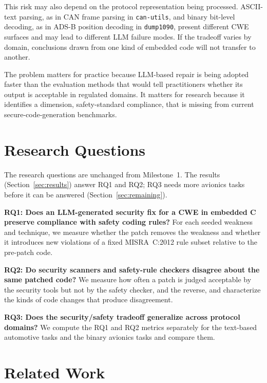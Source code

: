 \documentclass[12pt]{IEEEtran}
\begin{document}
This risk may also depend on the protocol representation being processed. ASCII-text parsing, as in CAN frame parsing in \texttt{can-utils}, and binary bit-level decoding, as in ADS-B position decoding in \texttt{dump1090}, present different CWE surfaces and may lead to different LLM failure modes. If the tradeoff varies by domain, conclusions drawn from one kind of embedded code will not transfer to another.

The problem matters for practice because LLM-based repair is being adopted faster than the evaluation methods that would tell practitioners whether its output is acceptable in regulated domains. It matters for research because it identifies a dimension, safety-standard compliance, that is missing from current secure-code-generation benchmarks.

\section{Research Questions}
The research questions are unchanged from Milestone~1. The results (Section~\ref{sec:results}) answer RQ1 and RQ2; RQ3 needs more avionics tasks before it can be answered (Section~\ref{sec:remaining}).

\textbf{RQ1: Does an LLM-generated security fix for a CWE in embedded C preserve compliance with safety coding rules?}
For each seeded weakness and technique, we measure whether the patch removes the weakness and whether it introduces new violations of a fixed MISRA~C:2012 rule subset relative to the pre-patch code.

\textbf{RQ2: Do security scanners and safety-rule checkers disagree about the same patched code?}
We measure how often a patch is judged acceptable by the security tools but not by the safety checker, and the reverse, and characterize the kinds of code changes that produce disagreement.

\textbf{RQ3: Does the security/safety tradeoff generalize across protocol domains?}
We compute the RQ1 and RQ2 metrics separately for the text-based automotive tasks and the binary avionics tasks and compare them.

\section{Related Work}
\end{document}
